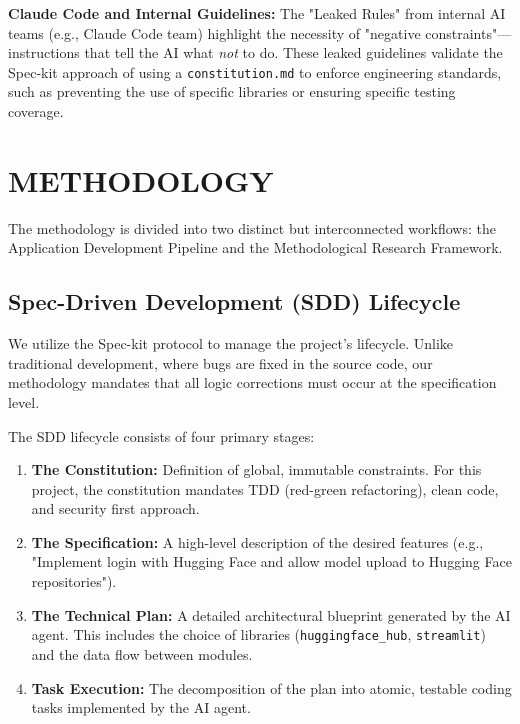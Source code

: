 \documentclass[a4paper,12pt]{report}
\begin{document}
\textbf{Claude Code and Internal Guidelines:} The "Leaked Rules" from internal AI teams (e.g., Claude Code team) \cite{claude_leaked_rules} highlight the necessity of "negative constraints"—instructions that tell the AI what \textit{not} to do. These leaked guidelines validate the Spec-kit approach of using a \texttt{constitution.md} to enforce engineering standards, such as preventing the use of specific libraries or ensuring specific testing coverage.

\chapter{METHODOLOGY}
The methodology is divided into two distinct but interconnected workflows: the Application Development Pipeline and the Methodological Research Framework.

\section{Spec-Driven Development (SDD) Lifecycle}
We utilize the Spec-kit protocol to manage the project's lifecycle. Unlike traditional development, where bugs are fixed in the source code, our methodology mandates that all logic corrections must occur at the specification level.

The SDD lifecycle consists of four primary stages:
\begin{enumerate}
\item \textbf{The Constitution:} Definition of global, immutable constraints. For this project, the constitution mandates TDD (red-green refactoring), clean code, and security first approach.
\item \textbf{The Specification:} A high-level description of the desired features (e.g., "Implement login with Hugging Face and allow model upload to Hugging Face repositories").
\item \textbf{The Technical Plan:} A detailed architectural blueprint generated by the AI agent. This includes the choice of libraries (\texttt{huggingface\_hub}, \texttt{streamlit}) and the data flow between modules.
\item \textbf{Task Execution:} The decomposition of the plan into atomic, testable coding tasks implemented by the AI agent.
\end{enumerate}
\end{document}
